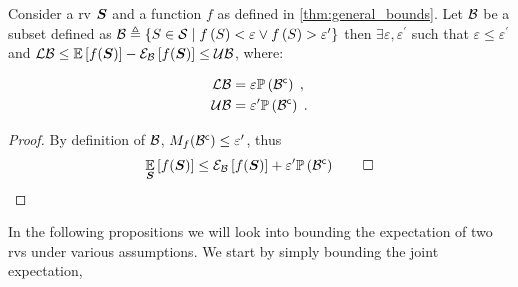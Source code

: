 \begin{proposition}
	\label{thm:bound_epsilon}
	Consider a \gls{rv} $\boldsymbol S$ and a function $f$ as defined in \cref{thm:general_bounds}. Let $\mathcal B$ be a subset defined as $\mathcal B\triangleq\{S\in\mathcal S \mid f\left(S\right) < \varepsilon\lor f\left(S\right) > \varepsilon^\prime\}$ then $\exists\varepsilon,\varepsilon^\prime$ such that $\varepsilon\leq\varepsilon^\prime$ and $\operatorname*{\mathcal{LB}}\leq\operatorname*{\mathbb{E}}\limits_{}\left[{f(\boldsymbol S)}\right]-\mathcal{E}_{\mathcal B}\left[{f(\boldsymbol S)}\right]\leq\operatorname*{\mathcal{UB}}$, where:
	\begin{subequations}
		\begin{align}
			\operatorname*{\mathcal{LB}} & =\varepsilon\mathbb{P}\left({{\mathcal B}^{\mathsf{c}}}\right)\;,
			\\
			\operatorname*{\mathcal{UB}} & =\varepsilon^\prime\mathbb{P}\left({{\mathcal B}^{\mathsf{c}}}\right)\;.
		\end{align}
	\end{subequations}
\end{proposition}
\begin{proof}
	By definition of $\mathcal B$, $M_f({\mathcal B}^{\mathsf{c}})\leq\varepsilon^\prime$,  thus
	\begin{equation*}
		\operatorname*{\mathbb{E}}\limits_{\boldsymbol S}\left[{f(\boldsymbol S)}\right]\leq\mathcal{E}_{\mathcal B}\left[{f(\boldsymbol S)}\right] +\varepsilon^\prime\mathbb{P}\left({{\mathcal B}^{\mathsf{c}}}\right)\qed
	\end{equation*}
\end{proof}

In the following propositions we will look into bounding the expectation of two \glspl{rv} under various assumptions. We start by simply bounding the joint expectation,

